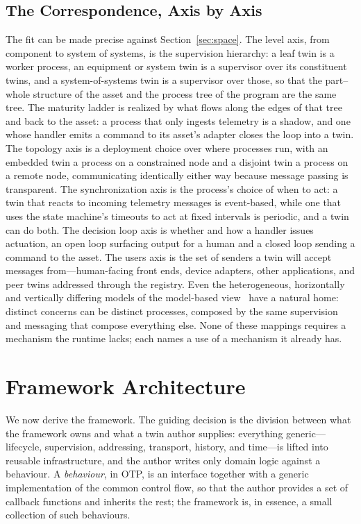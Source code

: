 \documentclass[conference]{IEEEtran}
\newcommand{\otp}{OTP\xspace}
\begin{document}
\subsection{The Correspondence, Axis by Axis}
The fit can be made precise against Section~\ref{sec:space}. The level axis,
from component to system of systems, is the supervision hierarchy: a leaf twin
is a worker process, an equipment or system twin is a supervisor over its
constituent twins, and a system-of-systems twin is a supervisor over those, so
that the part--whole structure of the asset and the process tree of the program
are the same tree. The maturity ladder is realized by what flows along the edges
of that tree and back to the asset: a process that only ingests telemetry is a
shadow, and one whose handler emits a command to its asset's adapter closes the
loop into a twin. The topology axis is a deployment choice over where processes
run, with an embedded twin a process on a constrained node and a disjoint twin a
process on a remote node, communicating identically either way because message
passing is transparent. The synchronization axis is the process's choice of when
to act: a twin that reacts to incoming telemetry messages is event-based, while
one that uses the state machine's timeouts to act at fixed intervals is
periodic, and a twin can do both. The decision loop axis is whether and how a
handler issues actuation, an open loop surfacing output for a human and a closed
loop sending a command to the asset. The users axis is the set of senders a twin
will accept messages from---human-facing front ends, device adapters, other
applications, and peer twins addressed through the registry. Even the
heterogeneous, horizontally and vertically differing models of the model-based
view~\cite{kovalyov2024} have a natural home: distinct concerns can be distinct
processes, composed by the same supervision and messaging that compose
everything else. None of these mappings requires a mechanism the runtime lacks;
each names a use of a mechanism it already has.

\section{Framework Architecture}
\label{sec:arch}
We now derive the framework. The guiding decision is the division between what
the framework owns and what a twin author supplies: everything generic---
lifecycle, supervision, addressing, transport, history, and time---is lifted
into reusable infrastructure, and the author writes only domain logic against a
behaviour. A \emph{behaviour}, in \otp, is an interface together with a generic
implementation of the common control flow, so that the author provides a set of
callback functions and inherits the rest; the framework is, in essence, a small
collection of such behaviours.
\end{document}
